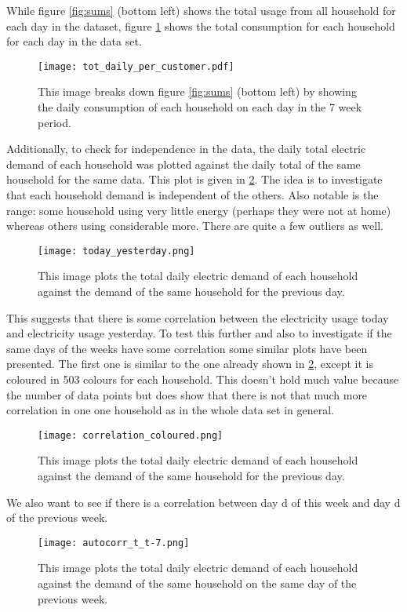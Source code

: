 \documentclass[a4paper]{article}
\begin{document}
While figure \ref{fig:sums} (bottom left) shows the total usage from all household for each day in the dataset, figure \ref{fig:totes} shows the total consumption for each household for each day in the data set.

\begin{figure}
\centering
\texttt{[image: tot\_daily\_per\_customer.pdf]}
\caption{ This image breaks down figure \ref{fig:sums} (bottom left) by showing the daily consumption of each household on each day in the 7 week period.}
\label{fig:totes}
\end{figure}

Additionally, to check for independence in the data, the daily total electric demand of each household was plotted against the daily total of the same household for the same data. This plot is given in \ref{fig:ty}. The idea is to investigate that each household demand is independent of the others. Also notable is the range: some household using very little energy (perhaps they were not at home) whereas others using considerable more. There are quite a few outliers as well.

\begin{figure}
\centering
\texttt{[image: today\_yesterday.png]}
\caption{This image plots the total daily electric demand of each household against the demand of the same household for the previous day.}
\label{fig:ty} 
\end{figure}

This suggests that there is some correlation between the electricity usage today  and electricity usage yesterday. To test this further and also to investigate if the same days of the weeks have some correlation some similar plots have been presented.
The first one is similar to the one already shown in \ref{fig:ty}, except it is coloured in 503 colours for each household. This doesn't hold much value because the number of data points but does show that there is not that much more correlation in one one household as in the whole data set in general.

\begin{figure}
\centering
\texttt{[image: correlation\_coloured.png]}
\caption{This image plots the total daily electric demand of each household against the demand of the same household for the previous day.}
\label{fig:ty_colour} 
\end{figure}

We also want to see if there is a correlation between day d of this week and day d of the previous week.
\begin{figure}
\centering
\texttt{[image: autocorr\_t\_t-7.png]}
\caption{This image plots the total daily electric demand of each household against the demand of the same household on the same day of the previous week.}
\label{fig:day_d_autocorr} 
\end{figure}
\end{document}
